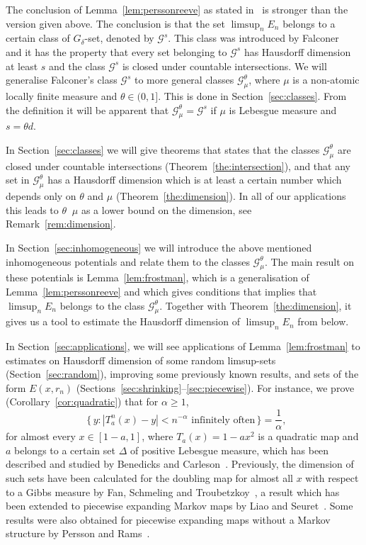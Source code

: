 \documentclass[11pt]{article}
\theoremstyle{definition}
\numberwithin{equation}{section}
\numberwithin{figure}{section}
\numberwithin{table}{section}
\DeclareMathOperator{\dimh}{dim_H}
\DeclareMathOperator{\udimh}{\overline{dim}_H}
\begin{document}
The conclusion of Lemma~\ref{lem:perssonreeve} as stated in~\cite{perssonreeve} is stronger than the version given above. The conclusion is that the set $\limsup_n E_n$ belongs to a certain class of $G_\delta$-set, denoted by $\mathscr{G}^s$. This class was introduced by Falconer~\cite{falconer1, falconer2} and it has the property that every set belonging to $\mathscr{G}^s$ has Hausdorff dimension at least $s$ and the class $\mathscr{G}^s$ is closed under countable intersections. We will generalise Falconer's class $\mathscr{G}^s$ to more general classes $\mathscr{G}_\mu^\theta$, where $\mu$ is a non-atomic locally finite measure and $\theta \in (0,1]$. This is done in Section~\ref{sec:classes}. From the definition it will be apparent that $\mathscr{G}_\mu^\theta =
\mathscr{G}^s$ if $\mu$ is Lebesgue measure and $s = \theta d$.

In Section~\ref{sec:classes} we will give theorems that states that the classes $\mathscr{G}_\mu^\theta$ are closed under countable intersections (Theorem~\ref{the:intersection}), and that any set in $\mathscr{G}_\mu^\theta$ has a Hausdorff dimension which is at least a certain number which depends only on $\theta$ and $\mu$ (Theorem~\ref{the:dimension}). In all of our applications this leads to $\theta \udimh \mu$ as a lower bound on the dimension, see Remark~\ref{rem:dimension}.

In Section~\ref{sec:inhomogeneous} we will introduce the above mentioned inhomogeneous potentials and relate them to the classes $\mathscr{G}_\mu^\theta$. The main result on these potentials is Lemma~\ref{lem:frostman}, which is a generalisation of Lemma~\ref{lem:perssonreeve} and which gives conditions that implies that $\limsup_n E_n$ belongs to the class $\mathscr{G}_\mu^\theta$. Together with Theorem~\ref{the:dimension}, it gives us a tool to estimate the Hausdorff dimension of $\limsup_n E_n$ from below.

In Section~\ref{sec:applications}, we will see applications of Lemma~\ref{lem:frostman} to estimates on Hausdorff dimension of some random limsup-sets (Section~\ref{sec:random}), improving some previously known results, and sets of the form $E(x,r_n)$ (Sections~\ref{sec:shrinking}--\ref{sec:piecewise}). For instance, we prove (Corollary~\ref{cor:quadratic}) that for $\alpha \geq 1$,
\[
\dimh \{ \, y : | T_a^n (x) - y| < n^{-\alpha} \text{ infinitely often} \, \} = \frac{1}{\alpha},
\]
for almost every $x \in [1-a, 1]$, where $T_a (x) = 1 - a x^2$ is a quadratic map and $a$ belongs to a certain set $\Delta$ of positive Lebesgue measure, which has been described and studied by Benedicks and Carleson~\cite{benedickscarleson}. Previously, the dimension of such sets have been calculated for the doubling map for almost all $x$ with respect to a Gibbs measure by Fan, Schmeling and Troubetzkoy~\cite{fanschmelingtroubetzkoy}, a result which has been extended to piecewise expanding Markov maps by Liao and Seuret~\cite{liaoseuret}. Some results were also obtained for piecewise expanding maps without a Markov structure by Persson and Rams~\cite{perssonrams}.
\end{document}
